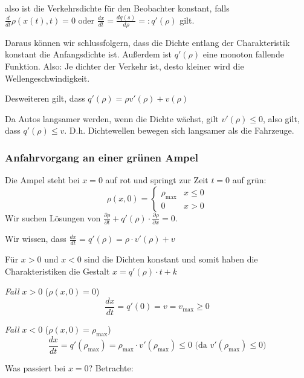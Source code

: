 \documentclass[]{article}
\begin{document}
also ist die Verkehrsdichte für den Beobachter konstant, falls $\frac{d}{dt} \rho(x(t), t) = 0 \text{ oder } \frac{dx}{dt} = \frac{dq(s)}{d \rho} =: q'(\rho)$
 gilt. 

Daraus können wir schlussfolgern, dass die Dichte entlang der Charakteristik konstant die Anfangsdichte ist. 
Außerdem ist $q'(\rho)$ eine monoton fallende Funktion. Also: Je dichter der Verkehr ist, desto kleiner wird die Wellengeschwindigkeit. 

Desweiteren gilt, dass $q'(\rho)=\rho v'(\rho) + v(\rho)$

Da Autos langsamer werden, wenn die Dichte wächst, gilt $v'(\rho) \le 0$, also gilt, dass $q'(\rho) \leq v $. D.h. Dichtewellen bewegen sich langsamer als die Fahrzeuge. 


\subsubsection*{Anfahrvorgang an einer grünen Ampel}
Die Ampel steht bei $x=0$ auf \glqq rot\grqq{} und springt zur Zeit $t=0$ auf \glqq grün\grqq{}:
\begin{equation}
\rho(x,0) =
\begin{cases}
\rho_{\max} & x \leq 0 \\
0 & x > 0
\end{cases}
\end{equation}
Wir suchen Lösungen von $\frac{\partial \rho}{\partial t} + q'(\rho) \cdot \frac{\partial \rho}{\partial x} = 0$.

Wir wissen, dass $\frac{d x}{d t} = q'(\rho) = \rho \cdot v'(\rho) + v$

Für $x > 0$ und $x < 0$ sind die Dichten konstant und somit haben die Charakteristiken die Gestalt $ x = q'(\rho) \cdot t + k $
\begin{center}
	\begin{minipage}{5cm}
		\textit{Fall $x > 0$}  ($\rho(x,0) = 0$)
		\begin{equation*}
		\frac{d x}{d t} = q'(0) = v = v_{\max} \geq 0
		\end{equation*} 
	\end{minipage}
	\hspace{1cm}
	\begin{minipage}{5cm}
		\textit{Fall $x < 0$} ($\rho(x,0) = \rho_{\text{max}}$)
		\begin{equation*}
		\frac{d x}{d t} = q'(\rho_{\max}) = \rho_{\max} \cdot v'(\rho_{\max})\leq 0 \text{ (da } v'(\rho_{\max})\le 0)
		\end{equation*}
	\end{minipage}
\end{center}
Was passiert bei $x=0$? Betrachte:
\end{document}
